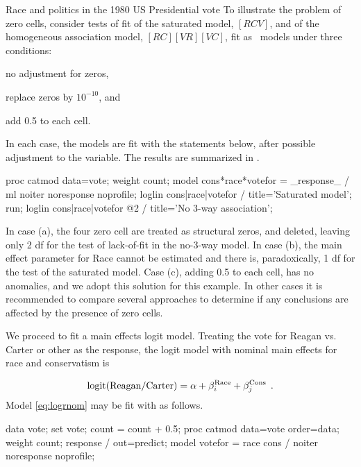 \begin{Example}[reagan]{Race and politics in the 1980 US Presidential vote}
To illustrate the problem of zero cells, consider tests of fit of the
saturated model, $[RCV]$, and of the homogeneous association model,
$[RC] [VR] [VC]$, fit as \loglin\ models under three conditions:
\begin{seriate}
\item no adjustment for zeros,
\item replace zeros by $10^{-10}$, and
\item add 0.5 to each cell.
\end{seriate}
In each case, the models are fit
with the statements below, after possible adjustment to the 
variable.
The results are summarized in .
\begin{listing}
proc catmod data=vote;
   weight count;
   model cons*race*votefor = _response_ / ml noiter noresponse noprofile;
   loglin cons|race|votefor / title='Saturated model';
  run;
   loglin cons|race|votefor @2 / title='No 3-way association';
\end{listing}
In case (a), the four zero cell are treated as structural zeros, and
deleted, leaving only 2 df for the test of lack-of-fit in the
no-3-way model.
In case (b), the main effect parameter for Race cannot be estimated
and there is, paradoxically, 1 df for the test of the saturated model.
Case (c), adding 0.5 to each cell, has no anomalies, and we adopt this
solution for this example. In other cases it is recommended to compare
several approaches to determine if any conclusions are affected by
the presence of zero cells.



\begin{Output}[htb]
\caption{Vote data: Test of Homogeneity of odds ratios}\label{out:reagan1.1}
\small

\end{Output}

We proceed to fit a main effects logit model.
Treating the vote for Reagan vs. Carter or other as the response, the
logit model with nominal main effects for race and conservatism is

\begin{equation} \label{eq:logrnom}
    \logit ( \mbox{Reagan} / \mbox{Carter} )  =
    \alpha   +
    \beta _i^{\mbox{\scriptsize Race}}  +
    \beta _j^{\mbox{\scriptsize Cons}}
	 \period
\end{equation}
Model \eqref{eq:logrnom} may be fit with  as follows. \begin{listing}
data vote;
    set vote;
    count = count + 0.5;
proc catmod data=vote order=data;
   weight count;
   response / out=predict;
   model votefor = race cons / noiter noresponse noprofile;
\end{listing}


\end{Example}
